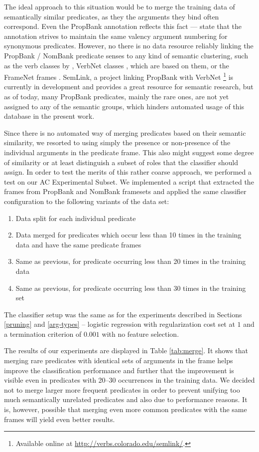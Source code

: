 \documentclass[12pt,notitlepage]{report}
\begin{document}
The ideal approach to this situation would be to merge the training data of semantically similar predicates, as they the arguments they bind often correspond. Even the PropBank annotation reflects this fact --- \citet{kingsbury02} state that the annotation strives to maintain the same valency argument numbering for synonymous predicates. However, no there is no data resource reliably linking the PropBank / NomBank predicate senses to any kind of semantic clustering, such as the verb classes by \citet{levin93}, VerbNet classes \citep{kipper-schuler05}, which are based on them, or the FrameNet frames \citep{baker98,baker02}. SemLink, a project linking PropBank with VerbNet \citep{loper07}\footnote{Available online at \url{http://verbs.colorado.edu/semlink/}.} is currently in development and provides a great resource for semantic research, but as of today, many PropBank predicates, mainly the rare ones, are not yet assigned to any of the semantic groups, which hinders automated usage of this database in the present work.

Since there is no automated way of merging predicates based on their semantic similarity, we resorted to using simply the presence or non-presence of the individual arguments in the predicate frame. This also might suggest some degree of similarity or at least distinguish a subset of roles that the classifier should assign. In order to test the merits of this rather coarse approach, we performed a test on our AC Experimental Subset. We implemented a script that extracted the frames from PropBank and NomBank framesets and applied the same classifier configuration to the following variants of the data set:
\begin{enumerate}
    \item Data split for each individual predicate
    \item Data merged for predicates which occur less than 10 times in the training data and have the same predicate frames
    \item Same as previous, for predicate occurring less than 20 times in the training data 
    \item Same as previous, for predicate occurring less than 30 times in the training set
\end{enumerate}
The classifier setup was the same as for the experiments described in Sections \ref{pruning} and \ref{arg-types} -- logistic regression with regularization cost set at $1$ and a termination criterion of $0.001$ with no feature selection.

The results of our experiments are displayed in Table \ref{tab:merge}. It shows that merging rare predicates with identical sets of arguments in the frame helps improve the classification performance and further that the improvement is visible even in predicates with 20--30 occurrences in the training data. We decided not to merge larger more frequent predicates in order to prevent unifying too much semantically unrelated predicates and also due to performance reasons. It is, however, possible that merging even more common predicates with the same frames will yield even better results.
\end{document}
